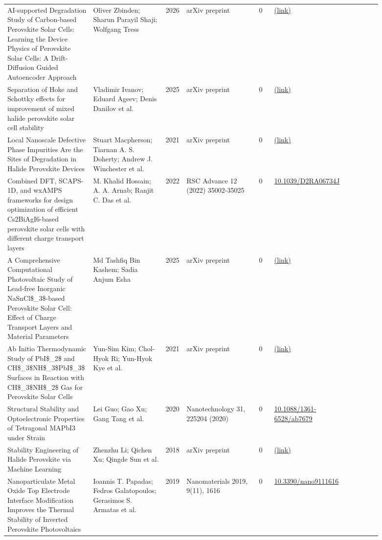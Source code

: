 \documentclass[10pt,a4paper]{article}
\begin{document}
{\begin{longtable}{p{0.197\linewidth}p{0.197\linewidth}p{0.043\linewidth}p{0.197\linewidth}p{0.043\linewidth}p{0.117\linewidth}p{0.098\linewidth}}
AI-supported Degradation Study of Carbon-based Perovskite Solar Cells: Learning the Device Physics of Perovskite Solar Cells: A Drift-Diffusion Guided Autoencoder Approach & Oliver Zbinden; Sharun Parayil Shaji; Wolfgang Tress & 2026 & arXiv preprint & 0 & \href{http://arxiv.org/abs/2603.22520v1}{(link)} &  \\
Separation of Hoke and Schottky effects for improvement of mixed halide perovskite solar cell stability & Vladimir Ivanov; Eduard Ageev; Denis Danilov et al. & 2025 & arXiv preprint & 0 & \href{http://arxiv.org/abs/2512.07523v1}{(link)} &  \\
Local Nanoscale Defective Phase Impurities Are the Sites of Degradation in Halide Perovskite Devices & Stuart Macpherson; Tiarnan A. S. Doherty; Andrew J. Winchester et al. & 2021 & arXiv preprint & 0 & \href{http://arxiv.org/abs/2107.09549v1}{(link)} &  \\
Combined DFT, SCAPS-1D, and wxAMPS frameworks for design optimization of efficient Cs2BiAgI6-based perovskite solar cells with different charge transport layers & M. Khalid Hossain; A. A. Arnab; Ranjit C. Das et al. & 2022 & RSC Advance 12 (2022) 35002-35025 & 0 & \href{https://doi.org/10.1039/D2RA06734J}{10.1039/D2RA06734J} &  \\
A Comprehensive Computational Photovoltaic Study of Lead-free Inorganic NaSnCl\$\_3\$-based Perovskite Solar Cell: Effect of Charge Transport Layers and Material Parameters & Md Tashfiq Bin Kashem; Sadia Anjum Esha & 2025 & arXiv preprint & 0 & \href{http://arxiv.org/abs/2503.02845v1}{(link)} &  \\
Ab Initio Thermodynamic Study of PbI\$\_2\$ and CH\$\_3\$NH\$\_3\$PbI\$\_3\$ Surfaces in Reaction with CH\$\_3\$NH\$\_2\$ Gas for Perovskite Solar Cells & Yun-Sim Kim; Chol-Hyok Ri; Yun-Hyok Kye et al. & 2021 & arXiv preprint & 0 & \href{http://arxiv.org/abs/2109.14553v1}{(link)} &  \\
Structural Stability and Optoelectronic Properties of Tetragonal MAPbI3 under Strain & Lei Guo; Gao Xu; Gang Tang et al. & 2020 & Nanotechnology 31, 225204 (2020) & 0 & \href{https://doi.org/10.1088/1361-6528/ab7679}{10.1088/1361-6528/ab7679} &  \\
Stability Engineering of Halide Perovskite via Machine Learning & Zhenzhu Li; Qichen Xu; Qingde Sun et al. & 2018 & arXiv preprint & 0 & \href{http://arxiv.org/abs/1803.06042v1}{(link)} &  \\
Nanoparticulate Metal Oxide Top Electrode Interface Modification Improves the Thermal Stability of Inverted Perovskite Photovoltaics & Ioannis T. Papadas; Fedros Galatopoulos; Gerasimos S. Armatas et al. & 2019 & Nanomaterials 2019, 9(11), 1616 & 0 & \href{https://doi.org/10.3390/nano9111616}{10.3390/nano9111616} &  \\

\end{longtable}}
\end{document}
